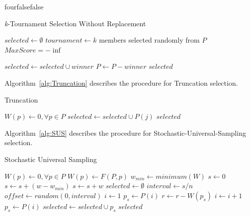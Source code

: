 \documentclass[times,12pt,titlepage]{mstogs}
\begin{document}
\begin{ThesisAppendix}{four}{false}{false}
\begin{algorithm}
\caption{\textit{k}-Tournament Selection Without Replacement}
\label{alg:TournamentNoReplacement}
\begin{algorithmic}[1]
 \label{proc:TournamentNoReplacement}
	\State $selected \leftarrow \emptyset$
		\State $tournament \leftarrow k$ members selected randomly from $P$
		\State $MaxScore = -\inf$

			\EndIf			
		\EndFor
		\State $selected \leftarrow selected \cup winner$
		\State $P \leftarrow P - winner$
	\EndFor
	\State \Return $selected$
\EndFunction
\end{algorithmic}
\end{algorithm}

Algorithm~\ref{alg:Truncation} describes the procedure for Truncation selection.

\begin{algorithm}
\caption{Truncation}
\label{alg:Truncation}
\begin{algorithmic}[1]
 \label{proc:Truncation}
	\State $W(p) \leftarrow 0,\forall p \in P$
	\EndFor
		\State $selected \leftarrow selected \cup P(j)$
	\EndFor
	\State \Return $selected$
\EndFunction
\end{algorithmic}
\end{algorithm}

Algorithm~\ref{alg:SUS} describes the procedure for Stochastic-Universal-Sampling selection.

\begin{algorithm}
\caption{Stochastic Universal Sampling}
\label{alg:SUS}
\begin{algorithmic}[1]
 \label{proc:SUS}
	\State $W(p) \leftarrow 0,\forall p \in P$
		\State $W(p) \leftarrow F(P,p)$
	\EndFor
	\State $w_{min} \leftarrow minimum(W)$	
	\State $s \leftarrow 0$
			\State $s \leftarrow s + (w - w_{min} )$			
		\Else
			\State $s \leftarrow s + w$		
		\EndIf	
	\EndFor
	\State $selected \leftarrow \emptyset$
	\State $interval \leftarrow s / n$
	\State $offset \leftarrow random(0,interval)$
		\State $i \leftarrow 1$
		\State $p_s \leftarrow P(i)$
			\State $r \leftarrow r - W(p_s)$
			\State $i \leftarrow i + 1$
			\State $p_s \leftarrow P(i)$
		\EndWhile	
		\State $selected \leftarrow selected \cup p_s$	
	\EndFor
	\State \Return $selected$
\EndFunction
\end{algorithmic}
\end{algorithm}


\end{ThesisAppendix}
\end{document}
